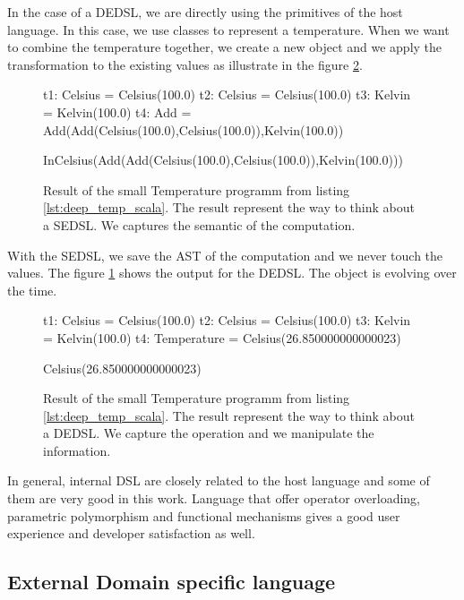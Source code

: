 In the case of a \gls{DEDSL}, we are directly using the primitives of the host
language. In this case, we use classes to represent a temperature. When we want
to combine the temperature together, we create a new object and we apply the
transformation to the existing values as illustrate in the figure \ref{fig:dsl_deep_result}.

\begin{figure}[ht]
  \centering
  \begin{scalacode}
t1: Celsius = Celsius(100.0)
t2: Celsius = Celsius(100.0)
t3: Kelvin = Kelvin(100.0)
t4: Add = Add(Add(Celsius(100.0),Celsius(100.0)),Kelvin(100.0))

InCelsius(Add(Add(Celsius(100.0),Celsius(100.0)),Kelvin(100.0)))
  \end{scalacode}
  \caption[Result of the \gls{SEDSL} for Temperature]{Result of the small
    Temperature programm from listing \ref{lst:deep_temp_scala}. The result
    represent the way to think about a \gls{SEDSL}. We captures the semantic of
    the computation.}
  \label{fig:dsl_shallow_result}
\end{figure}

With the \gls{SEDSL}, we save the \gls{AST} of the computation and we never
touch the values. The figure \ref{fig:dsl_shallow_result} shows the output for
the \gls{DEDSL}. The object is evolving over the time.

\begin{figure}[ht]
  \centering
  \begin{scalacode}
t1: Celsius = Celsius(100.0)
t2: Celsius = Celsius(100.0)
t3: Kelvin = Kelvin(100.0)
t4: Temperature = Celsius(26.850000000000023)

Celsius(26.850000000000023)
  \end{scalacode}
  \caption[Result of the \gls{DEDSL} for Temperature]{Result of the small
    Temperature programm from listing \ref{lst:deep_temp_scala}. The result
    represent the way to think about a \gls{DEDSL}. We capture the operation and
  we manipulate the information.}
  \label{fig:dsl_deep_result}
\end{figure}

In general, internal \gls{DSL} are closely related to the host language and some
of them are very good in this work. Language that offer operator overloading,
parametric polymorphism and functional mechanisms gives a good user experience
and developer satisfaction as well.

\subsection{External Domain specific language}
\label{sec:external_dsl}

